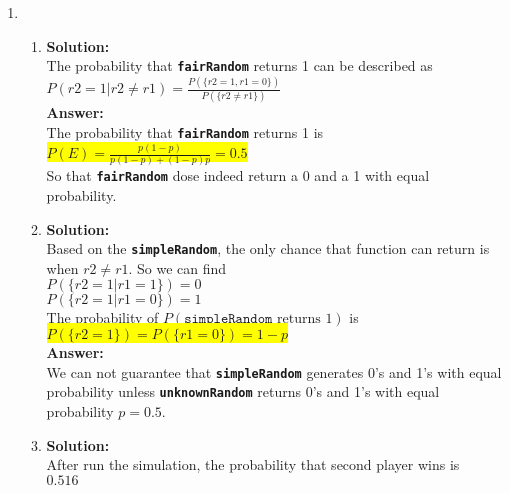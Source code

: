 \documentclass{article}
\newcommand{\myansw}{\textbf{Answer:}\\}
\newcommand{\mysolu}{\textbf{Solution:}\\}
\begin{document}
\begin{enumerate}
\begin{enumerate}
		${P(I)=\frac{6!}{3!}(p_1^3 p_2 p_3 p_4 + p_1 p_2^3 p_3 p_4 + p_1 p_2 p_3^3 p_4+ p_1 p_2 p_3 p_4^3) = 120(p_1^2+p_2^2+p_3^2+p_4^2) p_1 p_2 p_3 p_4}$\\
		\myansw
		\colorbox{yellow}{
		${P(E)=60(6p_5 + 3(p_1 p_2 + p_1 p_3 + p_1 p_4 + p_2 p_3 + p_2 p_4 + p_3 p_4)+2(p_1^2+p_2^2+p_3^2+p_4^2))p_1p_2p_3p_4}$}\\
		\item
		\myansw
		After substitute all the ${p_i}$ values, we can get\\
		\colorbox{yellow}{
			${P(E)=60\times(6\times 0.1 + 3\times 0.2925+2\times 0.225)\times 0.001875=0.2168}$
		}
		
	\end{enumerate}
	\item
	\begin{enumerate}
		\item
		\mysolu
		The probability that \textbf{\texttt{fairRandom}} returns 1 can be described as\\
		${P({r2 = 1|r2\neq r1})=\frac{P(\{r2 = 1, r1 = 0\})}{P(\{r2 \neq r1\})}}$\\
		\myansw
		The probability that \textbf{\texttt{fairRandom}} returns 1 is\\
		\colorbox{yellow}{${P(E)= \frac{p(1-p)}{p(1-p)+(1-p)p}=0.5}$}\\
		So that \textbf{\texttt{fairRandom}} dose indeed return a 0 and a 1 with equal probability.
		\item
		\mysolu
		Based on the \textbf{\texttt{simpleRandom}}, the only chance that function can return is when ${r2 \neq r1}$. So we can find\\
		${P(\{r2 = 1|r1 = 1\})=0}$\\
		${P(\{r2 = 1|r1 = 0\})=1}$\\
		The probability of ${P(\texttt{simpleRandom}\text{ returns 1})}$ is\\
		\colorbox{yellow}{
		${P(\{r2 = 1\})=P(\{r1=0\})=1-p}$}\\
		\myansw
		We can not guarantee that \textbf{\texttt{simpleRandom}} generates 0's and 1's with equal probability unless \textbf{\texttt{unknownRandom}} returns 0's and 1's with equal probability ${p = 0.5}$.
		\item
		\mysolu
		After run the simulation, the probability that second player wins is\\
		${0.516}$
		
	\end{enumerate}





\end{enumerate}

\newpage
\end{document}

